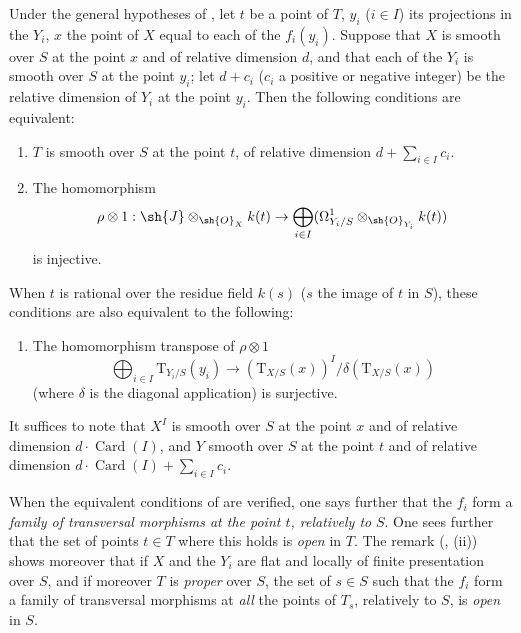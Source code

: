 \begin{corollary}[17.13.10]
\label{IV.17.13.10}
Under the general hypotheses of , let $t$ be a point of $T$, $y_i$ ($i\in I$) its projections in the $Y_i$, $x$ the point of $X$ equal to each of the $f_i(y_i)$.
Suppose that $X$ is smooth over $S$ at the point $x$ and of relative dimension $d$, and that each of the $Y_i$ is smooth over $S$ at the point $y_i$; let $d+c_i$ ($c_i$ a positive or negative integer) be the relative dimension of $Y_i$ at the point $y_i$.
Then the following conditions are equivalent:


\begin{enumerate}[label=\alph*)]
  \item $T$ is smooth over $S$ at the point $t$, of relative dimension $d+\sum_{i\in I} c_i$.
  \item The homomorphism
  \[
    \rho\otimes 1: \sh{J}\otimes_{\sh{O}_X}k(t) \to \bigoplus_{i\in I}(\Omega^1_{Y_i/S}\otimes_{\sh{O}_{Y_i}}k(t))
  \]
  is injective.
\end{enumerate}
When $t$ is rational over the residue field $k(s)$ ($s$ the image of $t$ in $S$), these conditions are also equivalent to the following:
\begin{enumerate}
  \item[b${}'$)] The homomorphism transpose of $\rho\otimes 1$
  \[
    \bigoplus_{i\in I}\mathrm{T}_{Y_i/S}(y_i) \to (\mathrm{T}_{X/S}(x))^I/\delta(\mathrm{T}_{X/S}(x))
  \]
  (where $\delta$ is the diagonal application) is surjective.
\end{enumerate}
It suffices to note that $X^I$ is smooth over $S$ at the point $x$ and of relative dimension $d\cdot\operatorname{Card}(I)$, and $Y$ smooth over $S$ at the point $t$ and of relative dimension $d\cdot\operatorname{Card}(I)+\sum_{i\in I} c_i$.

When the equivalent conditions of  are verified, one says further that the $f_i$ form a \emph{family of transversal morphisms at the point $t$, relatively to} $S$.
One sees further that the set of points $t\in T$ where this holds is \emph{open} in $T$.
The remark (, (ii)) shows moreover that if $X$ and the $Y_i$ are flat and locally of finite presentation over $S$, and if moreover $T$ is \emph{proper} over $S$, the set of $s\in S$ such that the $f_i$ form a family of transversal morphisms at \emph{all} the points of $T_s$, relatively to $S$, is \emph{open} in $S$.
\end{corollary}

